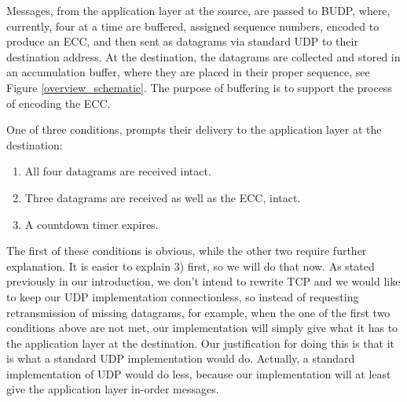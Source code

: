 \documentclass[conference]{IEEEtran}
\theoremstyle{definition}
\begin{document}





Messages, from the application layer at the source, are passed to
BUDP, where, currently, four at a time are buffered,
assigned sequence numbers, encoded to produce an ECC,
and then sent as datagrams via standard UDP to their
destination address. At the destination, the datagrams
are collected and stored in an accumulation buffer,
where they are placed in their proper sequence, see
Figure \ref{overview_schematic}.  The purpose of
buffering is to support the process of encoding the ECC.


One of three conditions,
prompts their delivery to the application layer at the
destination:\\

\begin{enumerate}
 \item All four datagrams are received intact.
 \item Three datagrams are received as well as
       the ECC, intact.
 \item A countdown timer expires.\\
\end{enumerate}

\noindent The first of these conditions is obvious, while
the other two require further explanation.  It
is easier to explain 3) first, so we will do
that now.  As stated previously in our introduction,
we don't intend to rewrite TCP and we would like
to keep our UDP implementation connectionless,
so instead of requesting retransmission of
missing datagrams, for example, when the one of
the first two conditions above are not met, our
implementation will simply give what it has to
the application layer at the destination.  Our
justification for doing this is that it is what
a standard UDP implementation would do.  Actually,
a standard implementation of UDP would do less,
because our implementation will at least give the
application layer in-order messages.

\end{document}
